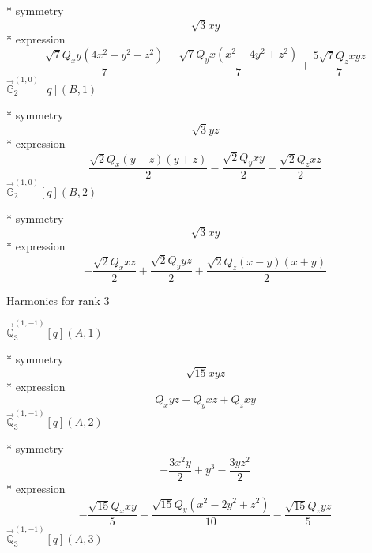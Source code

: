 \documentclass[fleqn,8pt]{jsarticle}
\begin{document}
\noindent\quad ** symmetry
\begin{dmath*}
\sqrt{3} x y
\end{dmath*}
\noindent\quad ** expression
\begin{dmath*}
\frac{\sqrt{7} Q_{x} y \left(4 x^{2} - y^{2} - z^{2}\right)}{7} - \frac{\sqrt{7} Q_{y} x \left(x^{2} - 4 y^{2} + z^{2}\right)}{7} + \frac{5 \sqrt{7} Q_{z} x y z}{7}
\end{dmath*}
\noindent\quad $\vec{\mathbb{G}}_{2}^{(1,0)}[q](B,1)$

\noindent\quad ** symmetry
\begin{dmath*}
\sqrt{3} y z
\end{dmath*}
\noindent\quad ** expression
\begin{dmath*}
\frac{\sqrt{2} Q_{x} \left(y - z\right) \left(y + z\right)}{2} - \frac{\sqrt{2} Q_{y} x y}{2} + \frac{\sqrt{2} Q_{z} x z}{2}
\end{dmath*}
\noindent\quad $\vec{\mathbb{G}}_{2}^{(1,0)}[q](B,2)$

\noindent\quad ** symmetry
\begin{dmath*}
\sqrt{3} x y
\end{dmath*}
\noindent\quad ** expression
\begin{dmath*}
- \frac{\sqrt{2} Q_{x} x z}{2} + \frac{\sqrt{2} Q_{y} y z}{2} + \frac{\sqrt{2} Q_{z} \left(x - y\right) \left(x + y\right)}{2}
\end{dmath*}

\noindent * Harmonics for rank 3

\noindent\quad $\vec{\mathbb{Q}}_{3}^{(1,-1)}[q](A,1)$

\noindent\quad ** symmetry
\begin{dmath*}
\sqrt{15} x y z
\end{dmath*}
\noindent\quad ** expression
\begin{dmath*}
Q_{x} y z + Q_{y} x z + Q_{z} x y
\end{dmath*}
\noindent\quad $\vec{\mathbb{Q}}_{3}^{(1,-1)}[q](A,2)$

\noindent\quad ** symmetry
\begin{dmath*}
- \frac{3 x^{2} y}{2} + y^{3} - \frac{3 y z^{2}}{2}
\end{dmath*}
\noindent\quad ** expression
\begin{dmath*}
- \frac{\sqrt{15} Q_{x} x y}{5} - \frac{\sqrt{15} Q_{y} \left(x^{2} - 2 y^{2} + z^{2}\right)}{10} - \frac{\sqrt{15} Q_{z} y z}{5}
\end{dmath*}
\noindent\quad $\vec{\mathbb{Q}}_{3}^{(1,-1)}[q](A,3)$
\end{document}
